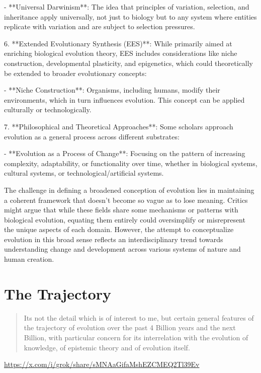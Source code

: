 \documentclass[10pt,titlepage]{book}
\begin{document}
   - **Universal Darwinism**: The idea that principles of variation, selection, and inheritance apply universally, not just to biology but to any system where entities replicate with variation and are subject to selection pressures.

6. **Extended Evolutionary Synthesis (EES)**: While primarily aimed at enriching biological evolution theory, EES includes considerations like niche construction, developmental plasticity, and epigenetics, which could theoretically be extended to broader evolutionary concepts:

   - **Niche Construction**: Organisms, including humans, modify their environments, which in turn influences evolution. This concept can be applied culturally or technologically.

7. **Philosophical and Theoretical Approaches**: Some scholars approach evolution as a general process across different substrates:

   - **Evolution as a Process of Change**: Focusing on the pattern of increasing complexity, adaptability, or functionality over time, whether in biological systems, cultural systems, or technological/artificial systems.

   The challenge in defining a broadened conception of evolution lies in maintaining a coherent framework that doesn't become so vague as to lose meaning. Critics might argue that while these fields share some mechanisms or patterns with biological evolution, equating them entirely could oversimplify or misrepresent the unique aspects of each domain. However, the attempt to conceptualize evolution in this broad sense reflects an interdisciplinary trend towards understanding change and development across various systems of nature and human creation.

   \section{The Trajectory}


   \begin{quotation}Its not the detail which is of interest to me, but certain general features of the trajectory of evolution over the past 4 Billion years and the next Billion, with particular concern for its interrelation with the evolution of knowledge, of epistemic theory and of evolution itself.
   \end{quotation}
   
   \url{https://x.com/i/grok/share/sMNAaGifaMshEZCMEQ2Tl39Ev}
\end{document}
